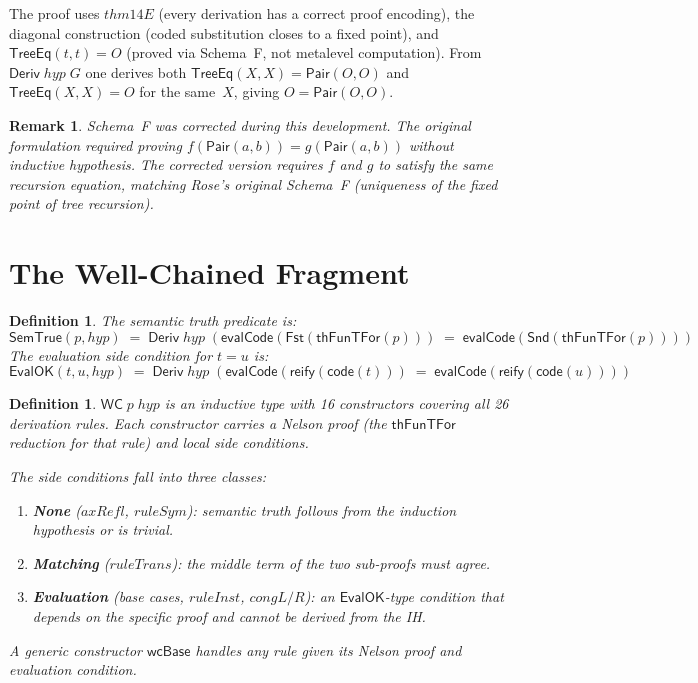 \documentclass[11pt]{article}
\newtheorem{definition}[theorem]{Definition}
\newtheorem{remark}[theorem]{Remark}
\newcommand{\Deriv}{\mathsf{Deriv}}
\newcommand{\WC}{\mathsf{WC}}
\newcommand{\SemTrue}{\mathsf{SemTrue}}
\newcommand{\EvalOK}{\mathsf{EvalOK}}
\newcommand{\evalCode}{\mathsf{evalCode}}
\newcommand{\thFunTFor}{\mathsf{thFunTFor}}
\newcommand{\reify}{\mathsf{reify}}
\newcommand{\code}{\mathsf{code}}
\newcommand{\Pair}{\mathsf{Pair}}
\newcommand{\TreeEq}{\mathsf{TreeEq}}
\begin{document}
The proof uses $\mathit{thm14E}$ (every derivation has a correct proof encoding),
the diagonal construction (coded substitution closes to a fixed point),
and $\TreeEq(t,t) = O$ (proved via Schema~F, not metalevel computation).
From $\Deriv\;\mathit{hyp}\;G$ one derives both $\TreeEq(X,X) = \Pair(O,O)$
and $\TreeEq(X,X) = O$ for the same~$X$, giving $O = \Pair(O,O)$.

\begin{remark}
Schema~F was corrected during this development. The original formulation
required proving $f(\Pair(a,b)) = g(\Pair(a,b))$ without inductive hypothesis.
The corrected version requires $f$ and $g$ to satisfy the \emph{same} recursion
equation, matching Rose's original Schema~F (uniqueness of the fixed point of tree recursion).
\end{remark}

\section{The Well-Chained Fragment}

\begin{definition}
The \emph{semantic truth predicate} is:
\[
  \SemTrue(p, \mathit{hyp}) \;=\;
  \Deriv\;\mathit{hyp}\;
  (\evalCode(\mathsf{Fst}(\thFunTFor(p))) \;=\;
   \evalCode(\mathsf{Snd}(\thFunTFor(p))))
\]
The \emph{evaluation side condition} for $t = u$ is:
\[
  \EvalOK(t, u, \mathit{hyp}) \;=\;
  \Deriv\;\mathit{hyp}\;
  (\evalCode(\reify(\code(t))) \;=\; \evalCode(\reify(\code(u))))
\]
\end{definition}

\begin{definition}
$\WC\;p\;\mathit{hyp}$ is an inductive type with 16 constructors
covering all 26 derivation rules. Each constructor carries a
\emph{Nelson proof} (the $\thFunTFor$ reduction for that rule)
and \emph{local side conditions}.

The side conditions fall into three classes:
\begin{enumerate}
\item \textbf{None} ($\mathit{axRefl}$, $\mathit{ruleSym}$):
  semantic truth follows from the induction hypothesis or is trivial.
\item \textbf{Matching} ($\mathit{ruleTrans}$): the middle term of the
  two sub-proofs must agree.
\item \textbf{Evaluation} (base cases, $\mathit{ruleInst}$,
  $\mathit{congL/R}$): an $\EvalOK$-type condition that depends
  on the specific proof and cannot be derived from the IH.
\end{enumerate}

A generic constructor $\mathsf{wcBase}$ handles any rule given its
Nelson proof and evaluation condition.
\end{definition}
\end{document}
